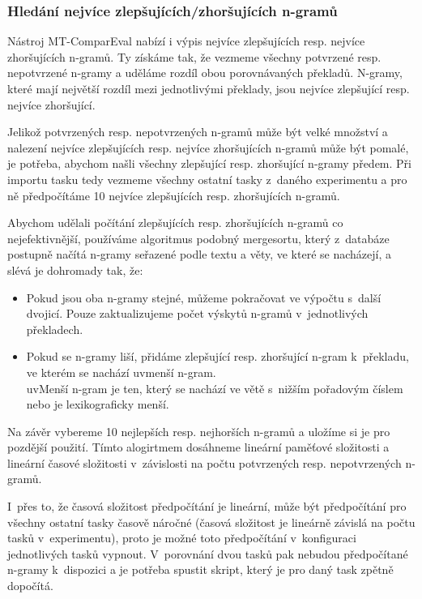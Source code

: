 \subsubsection{Hledání nejvíce zlepšujících/zhoršujících n-gramů}
Nástroj \mbox{MT-ComparEval} nabízí i výpis nejvíce zlepšujících resp. nejvíce zhoršujících n-gramů.
Ty získáme tak, že vezmeme všechny potvrzené resp. nepotvrzené n-gramy
  a uděláme rozdíl obou porovnávaných překladů.
N-gramy,
  které mají největší rozdíl mezi jednotlivými překlady,
  jsou nejvíce zlepšující resp. nejvíce zhoršující.

Jelikož potvrzených resp. nepotvrzených n-gramů může být velké množství
  a nalezení nejvíce zlepšujících resp. nejvíce zhoršujících n-gramů může být pomalé,
  je potřeba,
  abychom našli všechny zlepšující resp. zhoršující n-gramy předem.
Při importu tasku tedy vezmeme všechny ostatní tasky z~daného experimentu
  a pro ně předpočítáme 10 nejvíce zlepšujících resp. zhoršujících n-gramů. 

Abychom udělali počítání zlepšujících resp. zhoršujících n-gramů co nejefektivnější,
  používáme algoritmus podobný mergesortu,
  který z~databáze postupně načítá n-gramy seřazené podle textu a věty, ve které se nacházejí, 
  a slévá je dohromady tak, že:

\begin{itemize}
  \item Pokud jsou oba n-gramy stejné, můžeme pokračovat ve výpočtu s~další dvojicí.
    Pouze zaktualizujeme počet výskytů n-gramů v~jednotlivých překladech. 
  \item Pokud se n-gramy liší, přidáme zlepšující resp. zhoršující n-gram k~překladu,
    ve kterém se nachází uv{menší n-gram}. \\
    uv{Menší n-gram} je ten, který se nachází ve větě s~nižším pořadovým číslem
    nebo je lexikograficky menší.
\end{itemize}

Na závěr vybereme 10 nejlepších resp. nejhorších n-gramů
  a uložíme si je pro pozdější použití.
Tímto alogirtmem dosáhneme lineární paměťové složitosti a
  lineární časové složitosti v~závislosti na počtu potvrzených resp. nepotvrzených n-gramů.

I~přes to, že časová složitost předpočítání je lineární,
  může být předpočítání pro všechny ostatní tasky časově náročné
  (časová složitost je lineárně závislá na počtu tasků v~experimentu),
  proto je možné toto předpočítání v~konfiguraci jednotlivých tasků vypnout.
V~porovnání dvou tasků pak nebudou předpočítané n-gramy k~dispozici
  a je potřeba spustit skript,
  který je pro daný task zpětně dopočítá.

